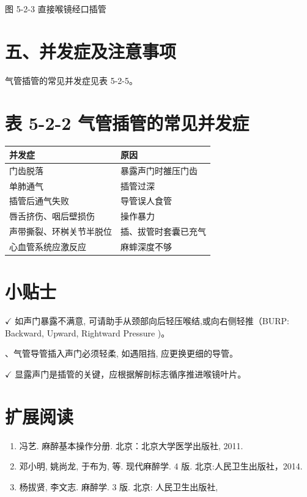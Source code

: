 \documentclass[10pt]{article}
\begin{document}
图 5-2-3 直接喉镜经口插管

\section*{五、并发症及注意事项}
气管插管的常见并发症见表 5-2-5。

\section*{表 5-2-2 气管插管的常见并发症}
\begin{center}
\begin{tabular}{ll}
\hline
并发症 & 原因 \\
\hline
门齿脱落 & 暴露声门时雒压门齿 \\
单肺通气 & 插管过深 \\
插管后通气失败 & 导管误人食管 \\
唇舌挤伤、咽后壁损伤 & 操作暴力 \\
声带撕裂、环桝关节半脱位 & 插、拔管时套囊已充气 \\
心血管系统应激反应 & 麻蟀深度不够 \\
\end{tabular}
\end{center}

\section*{小贴士}
$\checkmark$ 如声门暴露不满意, 可请助手从颈部向后轻压喉结,或向右侧轻推（BURP: Backward, Upward, Rightward Pressure )。

、气管导管插入声门必须轻柔, 如遇阻挡, 应更换更细的导管。

$\checkmark$ 显露声门是插管的关键，应根据解剖标志循序推进喉镜叶片。

\section*{扩展阅读}
\begin{enumerate}
  \item 冯艺. 麻醉基本操作分册. 北京：北京大学医学出版社, 2011.

  \item 邓小明, 姚尚龙, 于布为, 等. 现代麻醉学. 4 版. 北京:人民卫生出版社，2014.

  \item 杨拔贤, 李文志. 麻醉学. 3 版. 北京: 人民卫生出版社,

\end{enumerate}
\end{document}
